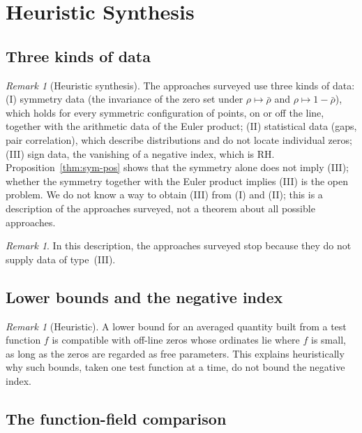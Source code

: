 \documentclass[11pt]{amsart}
\theoremstyle{definition}
\theoremstyle{remark}
\newtheorem{remark}[theorem]{Remark}
\begin{document}
\section{Heuristic Synthesis}
\label{sec:synthesis}

\subsection{Three kinds of data}

\begin{remark}[Heuristic synthesis]
\label{thm:synthesis}
The approaches surveyed use three kinds of data: (I) symmetry data (the invariance of the
zero set under $\rho\mapsto\bar\rho$ and $\rho\mapsto1-\bar\rho$), which holds for every
symmetric configuration of points, on or off the line, together with the arithmetic data of
the Euler product; (II) statistical data (gaps, pair correlation), which
describe distributions and do not locate individual zeros; (III) sign data, the vanishing
of a negative index, which is RH. Proposition~\ref{thm:sym-pos} shows that the symmetry alone does
not imply (III); whether the symmetry together with the Euler product implies (III) is the
open problem. We do not know a way to obtain (III) from (I) and (II); this is a description
of the approaches surveyed, not a theorem about all possible approaches.
\end{remark}

\begin{remark}
In this description, the approaches surveyed stop because they do not supply data of
type~(III).
\end{remark}

\subsection{Lower bounds and the negative index}

\begin{remark}[Heuristic]
A lower bound for an averaged quantity built from a test function $f$ is compatible with
off-line zeros whose ordinates lie where $f$ is small, as long as the zeros are regarded as
free parameters. This explains heuristically why such bounds, taken one test function at
a time, do not bound the negative index.
\end{remark}

\subsection{The function-field comparison}
\end{document}
